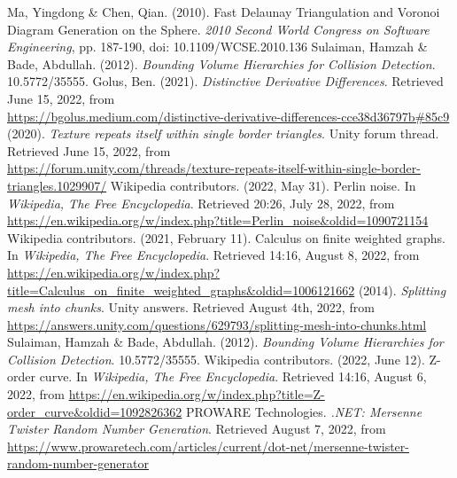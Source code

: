 \begin{thebibliography}{9}
Ma,  Yingdong \& Chen, Qian. (2010). Fast Delaunay Triangulation and Voronoi Diagram Generation on the Sphere. \textit{2010 Second World Congress on Software Engineering},  pp. 187-190, doi: 10.1109/WCSE.2010.136
Sulaiman, Hamzah \& Bade, Abdullah. (2012). \textit{Bounding Volume Hierarchies for Collision Detection}. 10.5772/35555.
Golus, Ben. (2021). \textit{Distinctive Derivative Differences}. Retrieved June 15, 2022, from\\ \url{https://bgolus.medium.com/distinctive-derivative-differences-cce38d36797b\#85c9}
(2020). \textit{Texture repeats itself within single border triangles}. Unity forum thread. Retrieved June 15, 2022, from\\ \url{https://forum.unity.com/threads/texture-repeats-itself-within-single-border-triangles.1029907/}
Wikipedia contributors. (2022, May 31). Perlin noise. In \textit{Wikipedia, The Free Encyclopedia}. Retrieved 20:26, July 28, 2022, from \url{https://en.wikipedia.org/w/index.php?title=Perlin\_noise\&oldid=1090721154}
Wikipedia contributors. (2021, February 11). Calculus on finite weighted graphs. In \textit{Wikipedia, The Free Encyclopedia}. Retrieved 14:16, August 8, 2022, from \url{https://en.wikipedia.org/w/index.php?title=Calculus\_on\_finite\_weighted\_graphs\&oldid=1006121662}
(2014). \textit{Splitting mesh into chunks}. Unity answers. Retrieved August 4th, 2022, from\\ \url{https://answers.unity.com/questions/629793/splitting-mesh-into-chunks.html}
Sulaiman, Hamzah \& Bade, Abdullah. (2012). \textit{Bounding Volume Hierarchies for Collision Detection}. 10.5772/35555.
Wikipedia contributors. (2022, June 12). Z-order curve. In \textit{Wikipedia, The Free Encyclopedia}. Retrieved 14:16, August 6, 2022, from \url{https://en.wikipedia.org/w/index.php?title=Z-order\_curve\&oldid=1092826362}
PROWARE Technologies. \textit{.NET: Mersenne Twister Random Number Generation}. Retrieved August 7, 2022, from \url{https://www.prowaretech.com/articles/current/dot-net/mersenne-twister-random-number-generator}
\end{thebibliography}